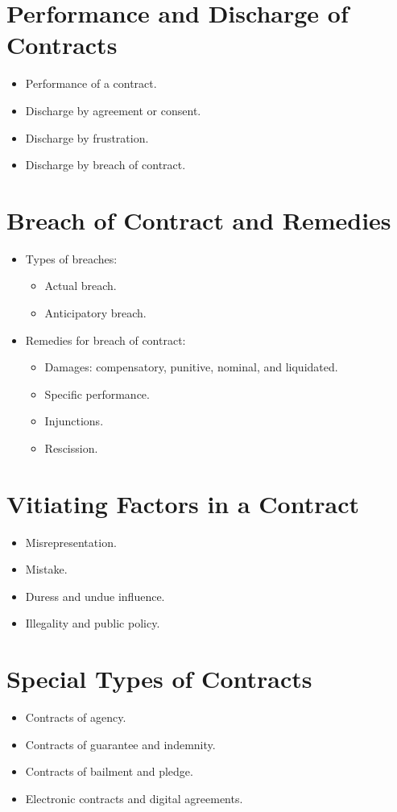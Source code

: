 \section{Performance and Discharge of Contracts}
\begin{itemize}
    \item Performance of a contract.
    \item Discharge by agreement or consent.
    \item Discharge by frustration.
    \item Discharge by breach of contract.
\end{itemize}

\section{Breach of Contract and Remedies}
\begin{itemize}
    \item Types of breaches:
    \begin{itemize}
        \item Actual breach.
        \item Anticipatory breach.
    \end{itemize}
    \item Remedies for breach of contract:
    \begin{itemize}
        \item Damages: compensatory, punitive, nominal, and liquidated.
        \item Specific performance.
        \item Injunctions.
        \item Rescission.
    \end{itemize}
\end{itemize}

\section{Vitiating Factors in a Contract}
\begin{itemize}
    \item Misrepresentation.
    \item Mistake.
    \item Duress and undue influence.
    \item Illegality and public policy.
\end{itemize}

\section{Special Types of Contracts}
\begin{itemize}
    \item Contracts of agency.
    \item Contracts of guarantee and indemnity.
    \item Contracts of bailment and pledge.
    \item Electronic contracts and digital agreements.
\end{itemize}

